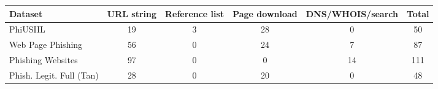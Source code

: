 \begin{tabular}{@{}lccccc@{}}
\toprule
\textbf{Dataset} & \textbf{URL string} & \textbf{Reference list} & \textbf{Page download} & \textbf{DNS/WHOIS/search} & \textbf{Total}\\
\midrule
PhiUSIIL & 19 & 3 & 28 & 0 & 50\\
Web Page Phishing & 56 & 0 & 24 & 7 & 87\\
Phishing Websites & 97 & 0 & 0 & 14 & 111\\
Phish. Legit. Full (Tan) & 28 & 0 & 20 & 0 & 48\\
\bottomrule
\end{tabular}
